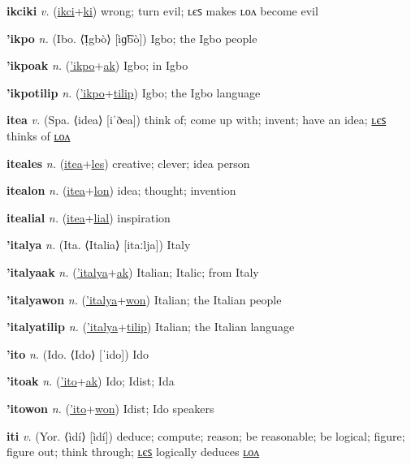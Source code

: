 \textbf{\hypertarget{ikciki}{ikciki}} \textit{v.} (\hyperlink{ikci}{ikci}+\allowbreak \hyperlink{ki}{ki})
wrong; turn evil; ʟєꜱ makes ʟᴏᴧ become evil

\textbf{\hypertarget{'ikpo}{'ikpo}} \textit{n.} (Ibo. ⟨Ị̀gbò⟩ [ìɡ͡bò])
Igbo; the Igbo people

\textbf{\hypertarget{'ikpoak}{'ikpoak}} \textit{n.} (\hyperlink{'ikpo}{'ikpo}+\allowbreak \hyperlink{ak}{ak})
Igbo; in Igbo

\textbf{\hypertarget{'ikpotilip}{'ikpotilip}} \textit{n.} (\hyperlink{'ikpo}{'ikpo}+\allowbreak \hyperlink{tilip}{tilip})
Igbo; the Igbo language

\textbf{\hypertarget{itea}{itea}} \textit{v.} (Spa. ⟨idea⟩ [iˈðea])
think of; come up with; invent; have an idea; \hyperlink{iteales}{ʟєꜱ} thinks of \hyperlink{itealon}{ʟᴏᴧ}

\textbf{\hypertarget{iteales}{iteales}} \textit{n.} (\hyperlink{itea}{itea}+\allowbreak \hyperlink{les}{les})
creative; clever; idea person

\textbf{\hypertarget{itealon}{itealon}} \textit{n.} (\hyperlink{itea}{itea}+\allowbreak \hyperlink{lon}{lon})
idea; thought; invention

\textbf{\hypertarget{itealial}{itealial}} \textit{n.} (\hyperlink{itea}{itea}+\allowbreak \hyperlink{lial}{lial})
inspiration

\textbf{\hypertarget{'italya}{'italya}} \textit{n.} (Ita. ⟨Italia⟩ [itaːlja])
Italy

\textbf{\hypertarget{'italyaak}{'italyaak}} \textit{n.} (\hyperlink{'italya}{'italya}+\allowbreak \hyperlink{ak}{ak})
Italian; Italic; from Italy

\textbf{\hypertarget{'italyawon}{'italyawon}} \textit{n.} (\hyperlink{'italya}{'italya}+\allowbreak \hyperlink{won}{won})
Italian; the Italian people

\textbf{\hypertarget{'italyatilip}{'italyatilip}} \textit{n.} (\hyperlink{'italya}{'italya}+\allowbreak \hyperlink{tilip}{tilip})
Italian; the Italian language

\textbf{\hypertarget{'ito}{'ito}} \textit{n.} (Ido. ⟨Ido⟩ [ˈido])
Ido

\textbf{\hypertarget{'itoak}{'itoak}} \textit{n.} (\hyperlink{'ito}{'ito}+\allowbreak \hyperlink{ak}{ak})
Ido; Idist; Ida

\textbf{\hypertarget{'itowon}{'itowon}} \textit{n.} (\hyperlink{'ito}{'ito}+\allowbreak \hyperlink{won}{won})
Idist; Ido speakers

\textbf{\hypertarget{iti}{iti}} \textit{v.} (Yor. ⟨ìdí⟩ [ìdí])
deduce; compute; reason; be reasonable; be logical; figure; figure out; think through; \hyperlink{itiles}{ʟєꜱ} logically deduces \hyperlink{itilon}{ʟᴏᴧ}

